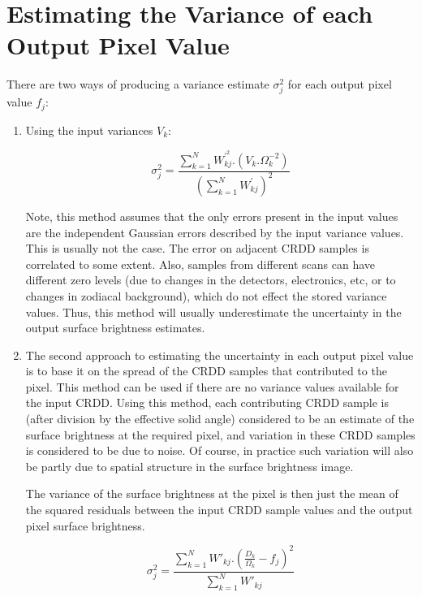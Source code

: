 \section{Estimating the Variance of each Output Pixel Value}
\label {SEC:VAR}
There are two ways of producing a variance estimate $\sigma^{2}_{j}$ for each 
output pixel value $f_{j}$:

\begin{enumerate}

\item

Using the input variances $V_{k}$:

\begin{equation}
\sigma^{2}_{j}=\frac{\sum_{k=1}^{N} W^{\prime^{2}}_{kj}.(V_{k}.\Omega_{k}^{-2})}
{(\sum_{k=1}^{N}W^{\prime}_{kj})^{2}}
\label {EQ:SIGMAJ}
\end{equation}

Note, this method assumes that the only errors present in the input values are
the independent Gaussian errors described by the input variance values. This is
usually not the case. The error on adjacent CRDD samples is correlated to some
extent. Also, samples from different scans can have different zero levels (due
to changes in the detectors, electronics, etc, or to changes in zodiacal
background), which do not effect the stored variance values. Thus, this method
will usually underestimate the uncertainty in the output surface brightness
estimates. 

\item

The second approach to estimating the uncertainty in each output pixel value
is to base it on the spread of the CRDD samples that contributed to the pixel. 
This method can be used if there are no variance values available for the input 
CRDD.
Using this method, each contributing CRDD sample is (after division by the
effective solid angle) considered to be an estimate of the surface brightness at
the required pixel, and variation in these CRDD samples is considered to be due
to noise. Of course, in practice such variation will also be partly due to
spatial structure in the surface brightness image. 

The variance of the surface brightness at the pixel is then just the mean of 
the squared residuals between the input CRDD sample values and the output pixel
surface brightness. 

\begin{equation}
\sigma^{2}_{j}=\frac{\sum_{k=1}^{N}W\prime_{kj}.(\frac{D_{k}}{\Omega_{k}}-f_{j})^{2}}
{\sum_{k=1}^{N}W\prime_{kj}}
\end{equation}


\end{enumerate}
